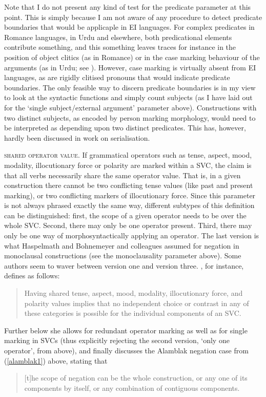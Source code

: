 Note that I do not present any kind of test for the predicate parameter at this point. This is simply because I am not aware of any procedure to detect predicate boundaries that would be applicaple in EI languages. For complex predicates in Romance languages, in Urdu and elsewhere, both predicational elements contribute something, and this something leaves traces for instance in the position of object clitics (as in Romance) or in the case marking behaviour of the arguments (as in Urdu; see \citealt[511]{butt2010light}). However, case marking is virtually absent from EI languages, as are rigidly clitised pronouns that would indicate predicate boundaries. The only feasible way to discern predicate boundaries is in my view to look at the syntactic functions and simply count subjects (as I have laid out for the `single subject/external argument' parameter above). Constructions with two distinct subjects, as encoded by person marking morphology, would need to be interpreted as depending upon two distinct predicates. This has, however, hardly been discussed in work on serialisation.

\textsc{shared operator value}. If grammatical operators such as tense, aspect, mood, modality, illocutionary force or polarity are marked within a SVC, the claim is that all verbs necessarily share the same operator value. That is, in a given construction there cannot be two conflicting tense values (like past and present marking), or two conflicting markers of illocutionary force. Since this parameter is not always phrased exactly the same way, different subtypes of this definition can be distinguished: first, the scope of a given operator needs to be over the whole SVC. Second, there may only be one operator present. Third, there may only be one way of morphosyntactically applying an operator. The last version is what Haspelmath and Bohnemeyer and colleagues assumed for negation in monoclausal constructions (see the monoclausality parameter above). Some authors seem to waver between version one and version three. \citet[8]{Aikhenvald2006}, for instance, defines as follows: 

\begin{quote}Having shared tense, aspect, mood, modality, illocutionary force, and polarity values implies that no independent choice or contrast in any of these categories is possible for the individual components of an SVC. \end{quote}


Further below she allows for redundant operator marking as well as for single marking in SVCs (thus explicitly rejecting the second version, `only one operator', from above), and finally discusses the Alamblak negation case from (\ref{alamblak1}) above, stating that \begin{quote}[t]he scope of negation can be the whole construction, or any one of its components by itself, or any combination of contiguous components. \citep[8f.]{Aikhenvald2006}\end{quote}

